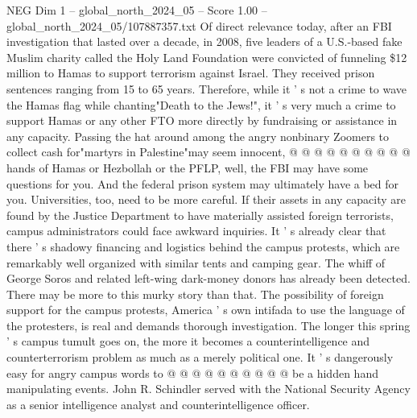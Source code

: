 \begin{textsample}{NEG Dim 1 – global\_north\_2024\_05 – Score 1.00 – global\_north\_2024\_05/107887357.txt}
Of direct relevance today, after an FBI investigation that lasted over a decade, in 2008, five leaders of a U.S.-based fake Muslim charity called the Holy Land Foundation were convicted of funneling \$12 million to Hamas to support terrorism against Israel.
They received prison sentences ranging from 15 to 65 years.
Therefore, while it ' s not a crime to wave the Hamas flag while chanting"Death to the Jews!", it ' s very much a crime to support Hamas or any other FTO more directly by fundraising or assistance in any capacity.
Passing the hat around among the angry nonbinary Zoomers to collect cash for"martyrs in Palestine"may seem innocent, @ @ @ @ @ @ @ @ @ @ hands of Hamas or Hezbollah or the PFLP, well, the FBI may have some questions for you.
And the federal prison system may ultimately have a bed for you.
Universities, too, need to be more careful.
If their assets in any capacity are found by the Justice Department to have materially assisted foreign terrorists, campus administrators could face awkward inquiries.
It ' s already clear that there ' s shadowy financing and logistics behind the campus protests, which are remarkably well organized with similar tents and camping gear.
The whiff of George Soros and related left-wing dark-money donors has already been detected.
There may be more to this murky story than that.
The possibility of foreign support for the campus protests, America ' s own intifada to use the language of the protesters, is real and demands thorough investigation.
The longer this spring ' s campus tumult goes on, the more it becomes a counterintelligence and counterterrorism problem as much as a merely political one.
It ' s dangerously easy for angry campus words to @ @ @ @ @ @ @ @ @ @ be a hidden hand manipulating events.
John R.
Schindler served with the National Security Agency as a senior intelligence analyst and counterintelligence officer.

\end{textsample}
